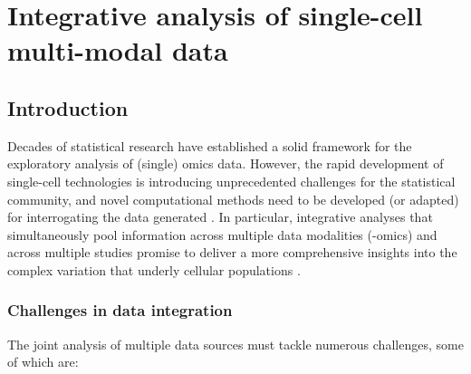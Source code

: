 \chapter{Integrative analysis of single-cell multi-modal data}

\section{Introduction}
Decades of statistical research have established a solid framework for the exploratory analysis of (single) omics data. However, the rapid development of single-cell technologies is introducing unprecedented challenges for the statistical community, and novel computational methods need to be developed (or adapted) for interrogating the data generated \cite{Stegle2015}. In particular, integrative analyses that simultaneously pool information across multiple data modalities (-omics) and across multiple studies promise to deliver a more comprehensive insights into the complex variation that underly cellular populations \cite{Stuart2019,Colome-Tatche2018}.\\

\subsection{Challenges in data integration}
The joint analysis of multiple data sources must tackle numerous challenges, some of which are:


